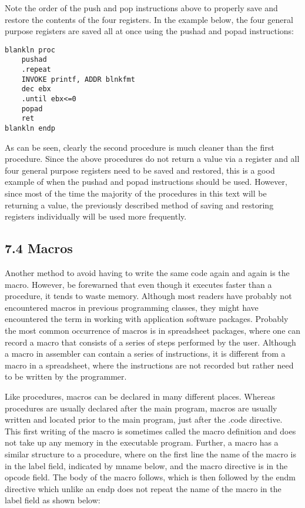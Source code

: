\documentclass[10pt]{article}
\begin{document}
Note the order of the push and pop instructions above to properly save and restore the contents of the four registers. In the example below, the four general purpose registers are saved all at once using the pushad and popad instructions:

\begin{verbatim}
blankln proc
    pushad
    .repeat
    INVOKE printf, ADDR blnkfmt
    dec ebx
    .until ebx<=0
    popad
    ret
blankln endp
\end{verbatim}

As can be seen, clearly the second procedure is much cleaner than the first procedure. Since the above procedures do not return a value via a register and all four general purpose registers need to be saved and restored, this is a good example of when the pushad and popad instructions should be used. However, since most of the time the majority of the procedures in this text will be returning a value, the previously described method of saving and restoring registers individually will be used more frequently.

\subsection*{7.4 Macros}
Another method to avoid having to write the same code again and again is the macro. However, be forewarned that even though it executes faster than a procedure, it tends to waste memory. Although most readers have probably not encountered macros in previous programming classes, they might have encountered the term in working with application software packages. Probably the most common occurrence of macros is in spreadsheet packages, where one can record a macro that consists of a series of steps performed by the user. Although a macro in assembler can contain a series of instructions, it is different from a macro in a spreadsheet, where the instructions are not recorded but rather need to be written by the programmer.

Like procedures, macros can be declared in many different places. Whereas procedures are usually declared after the main program, macros are usually written and located prior to the main program, just after the .code directive. This first writing of the macro is sometimes called the macro definition and does not take up any memory in the executable program. Further, a macro has a similar structure to a procedure, where on the first line the name of the macro is in the label field, indicated by mname below, and the macro directive is in the opcode field. The body of the macro follows, which is then followed by the endm directive which unlike an endp does not repeat the name of the macro in the label field as shown below:
\end{document}
